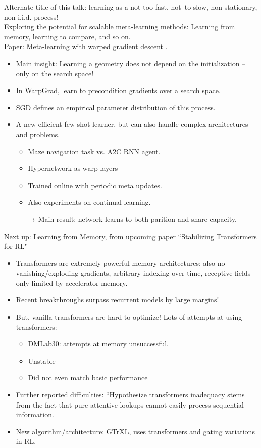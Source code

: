 Alternate title of this talk: learning as a not-too fast, not--to slow, non-stationary, non-i.i.d. process! \\

Exploring the potential for scalable meta-learning methods: Learning from memory, learning to compare, and so on. \\

Paper: Meta-learning with warped gradient descent \cite{flennerhag2019meta}.
\begin{itemize}
    \item Main insight: Learning  a geometry does not depend on the initialization -- only on the search space!
    \item In WarpGrad, learn to precondition gradients over a search space.
    \item SGD defines an empirical parameter distribution of this process.
    \item A new efficient few-shot learner, but can also handle complex architectures and problems.
    \begin{itemize}
        \item Maze navigation task vs. A2C RNN agent.
        \item Hypernetwork as warp-layers
        \item Trained online with periodic meta updates.
        \item Also experiments on continual learning.
        
        $\rightarrow$ Main result: network learns to both parition and share capacity.
    \end{itemize}
\end{itemize}

Next up: Learning from Memory, from upcoming paper ``Stabilizing Transformers for RL"
\begin{itemize}
    \item Transformers are extremely powerful memory architectures: also no vanishing/exploding gradients, arbitrary indexing over time, receptive fields only limited by accelerator memory.
    
    \item Recent breakthroughs surpass recurrent models by large margins!

    \item But, vanilla transformers are hard to optimize! Lots of attempts at using transformers:
    \begin{itemize}
        \item DMLab30: attempts at memory unsuccessful.
        \item Unstable
        \item Did not even match basic performance
    \end{itemize}
    \item Further reported difficulties: ``Hypothesize transformers inadequacy stems from the fact that pure attentive lookups cannot easily process sequential information.
    
    \item New algorithm/architecture: GTrXL, uses transformers and gating variations in RL.
\end{itemize}

